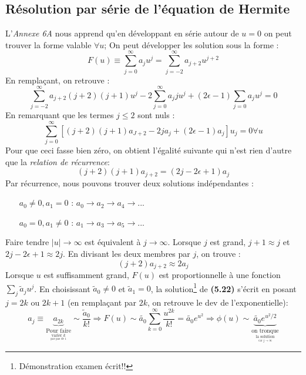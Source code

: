 \documentclass	[11pt, a4paper, openany]{book}
\begin{document}
	\subsection{Résolution par série de l'équation de Hermite}
	L'\textit{Annexe 6A} nous apprend qu'en développant en série autour de $u=0$ on peut trouver la forme valable $\forall  u$; On peut développer les solution sous la forme :
	\begin{equation}
		F(u) \equiv \sum_{j=0}^\infty a_ju^j = \sum_{j=-2}^\infty a_{j+2}u^{j+2}
	\end{equation}
	En remplaçant, on retrouve :
	\begin{equation}
		\sum_{j=-2}^\infty a_{j+2}(j+2)(j+1)u^j - 2\sum_{j=0}^\infty a_jju^j + (2\epsilon-1)\sum_{j=0} a_ju^j = 0
	\end{equation}
	En remarquant que les termes $j \leq 2$ sont nuls :
	\begin{equation}
		\sum_{j=0}^\infty\left[ (j+2)(j+1)a_{J+2} - 2ja_j + (2\epsilon - 1)a_j \right]u_j = 0 \forall u
	\end{equation}
	Pour que ceci fasse bien zéro, on obtient l'égalité suivante qui n'est rien d'autre que la \textit{relation de récurrence}:
	\begin{equation}\label{eq:5.21}
		(j+2)(j+1)a_{j+2} = (2j-2\epsilon+1)a_j
	\end{equation}
	Par récurrence, nous pouvons trouver deux solutions indépendantes :
	\begin{itemize}
		\item[$a_0 \neq 0, a_1 = 0$] : $a_0 \rightarrow a_2 \rightarrow a_4 \rightarrow ...$
		\item[$a_0 = 0, a_1 \neq 0$] : $a_1 \rightarrow a_3 \rightarrow a_5 \rightarrow ...$
	\end{itemize}
	Faire tendre $|u| \rightarrow \infty$ est équivalent à $j \rightarrow \infty$. Lorsque $j$ est grand, $j+1 \approx j$ et $2j-2\epsilon + 1 \approx 2j$. En divisant les deux membres par $j$, on trouve :
	\begin{equation}
		(j+2)a_{j+2} \approx 2a_j
	\end{equation}
	Lorsque $u$ est suffisamment grand, $F(u)$ est proportionnelle à une fonction $\sum_j \tilde{a}_ju^j$. En choisissant $\tilde{a}_0 \neq 0$ et $\tilde{a}_1 = 0$, la solution\footnote{Démonstration examen écrit!!} de \textbf{(5.22)} s'écrit en posant $j = 2k$ ou $2k+1$ (en remplaçant par $2k$, on retrouve le dev de l'exponentielle):
	\begin{equation}
		a_j \equiv \underbrace{a_{2k}}_{\underset{\underset{\text{par pas de 1}}{\text{varier $k$}}}{\text{Pour faire}}} \sim \frac{\tilde{a}_0}{k!} \Rightarrow F(u) \sim  \tilde{a_0}\sum_{k=0}^\infty \frac{u^{2k}}{k!} = \tilde{a_0}e^{u^2} \Rightarrow \phi(u) \sim \underbrace{\tilde{a_0}e^{u^2/2}}_{\underset{\underset{\text{car $j\rightarrow\infty$}}{\text{la solution}}}{\text{on tronque}}}
	\end{equation}
\end{document}
